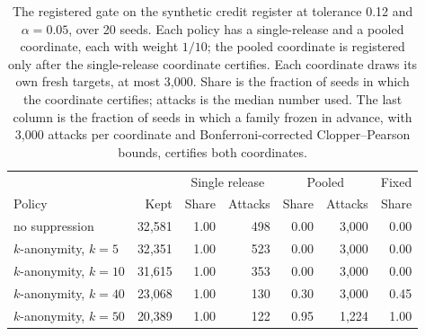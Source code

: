 \begin{table}[t]
\centering
\caption{The registered gate on the synthetic credit register at tolerance 0.12 and $\alpha=0.05$, over 20 seeds. Each policy has a single-release and a pooled coordinate, each with weight $1/10$; the pooled coordinate is registered only after the single-release coordinate certifies. Each coordinate draws its own fresh targets, at most 3{,}000. Share is the fraction of seeds in which the coordinate certifies; attacks is the median number used. The last column is the fraction of seeds in which a family frozen in advance, with 3{,}000 attacks per coordinate and Bonferroni-corrected Clopper--Pearson bounds, certifies both coordinates.}
\label{tab:credit-audit}
\small
\begin{tabular}{lrrrrrr}
\toprule
 & & \multicolumn{2}{c}{Single release} & \multicolumn{2}{c}{Pooled} & Fixed \\
Policy & Kept & Share & Attacks & Share & Attacks & Share \\
\midrule
no suppression & 32{,}581 & 1.00 & 498 & 0.00 & 3{,}000 & 0.00 \\
$k$-anonymity, $k=5$ & 32{,}351 & 1.00 & 523 & 0.00 & 3{,}000 & 0.00 \\
$k$-anonymity, $k=10$ & 31{,}615 & 1.00 & 353 & 0.00 & 3{,}000 & 0.00 \\
$k$-anonymity, $k=40$ & 23{,}068 & 1.00 & 130 & 0.30 & 3{,}000 & 0.45 \\
$k$-anonymity, $k=50$ & 20{,}389 & 1.00 & 122 & 0.95 & 1{,}224 & 1.00 \\
\bottomrule
\end{tabular}
\end{table}
